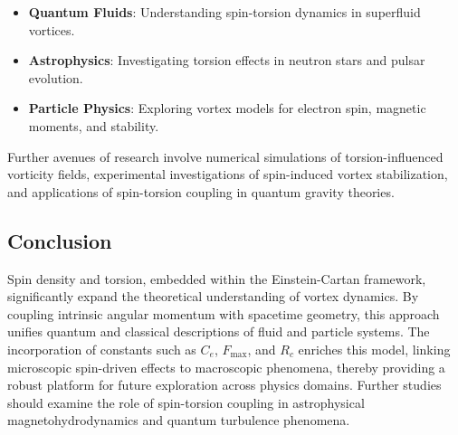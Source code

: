 \begin{itemize}

\item \textbf{Quantum Fluids}: Understanding spin-torsion dynamics in superfluid vortices.

\item \textbf{Astrophysics}: Investigating torsion effects in neutron stars and pulsar evolution.

\item \textbf{Particle Physics}: Exploring vortex models for electron spin, magnetic moments, and stability.

\end{itemize}

Further avenues of research involve numerical simulations of torsion-influenced vorticity fields, experimental investigations of spin-induced vortex stabilization, and applications of spin-torsion coupling in quantum gravity theories.


\subsection*{Conclusion}


Spin density and torsion, embedded within the Einstein-Cartan framework, significantly expand the theoretical understanding of vortex dynamics. By coupling intrinsic angular momentum with spacetime geometry, this approach unifies quantum and classical descriptions of fluid and particle systems. The incorporation of constants such as $C_e$, $F_{\text{max}}$, and $R_c$ enriches this model, linking microscopic spin-driven effects to macroscopic phenomena, thereby providing a robust platform for future exploration across physics domains. Further studies should examine the role of spin-torsion coupling in astrophysical magnetohydrodynamics and quantum turbulence phenomena.

